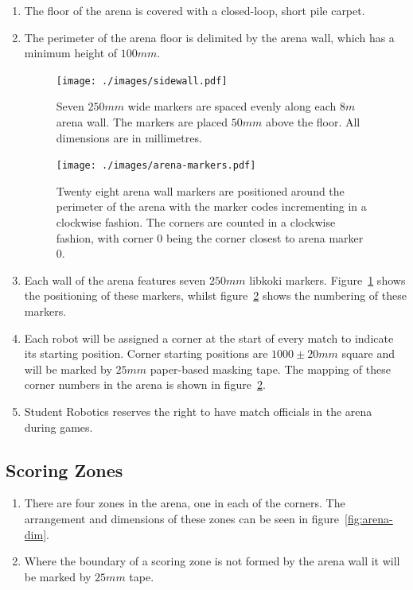 \begin{enumerate}
\item The floor of the arena is covered with a closed-loop, short pile carpet.

\item The perimeter of the arena floor is delimited by the arena wall, which has a minimum height of $100mm$.

\begin{figure}
  \centering
  \texttt{[image: ./images/sidewall.pdf]}
  \caption{Seven $250mm$ wide markers are spaced evenly along each $8m$ arena wall.
           The markers are placed $50mm$ above the floor.
           All dimensions are in millimetres.}
  \label{fig:arena-wall}
\end{figure}

\begin{figure}
  \centering
  \texttt{[image: ./images/arena-markers.pdf]}
  \caption{Twenty eight arena wall markers are positioned around the perimeter of the arena with the marker codes incrementing in a clockwise fashion.
           The corners are counted in a clockwise fashion, with corner 0 being the corner closest to arena marker 0.}
  \label{fig:arena-zones}
\end{figure}

\item Each wall of the arena features seven $250mm$ libkoki markers.
      Figure~\ref{fig:arena-wall} shows the positioning of these markers, whilst figure~\ref{fig:arena-zones} shows the numbering of these markers.

\item Each robot will be assigned a corner at the start of every match to indicate its starting position.
      Corner starting positions are $1000 \pm 20mm$ square and will be marked by $25mm$ paper-based masking tape.
      The mapping of these corner numbers in the arena is shown in figure~\ref{fig:arena-zones}.

\item Student Robotics reserves the right to have match officials in the arena during games.

\end{enumerate}


\subsection{Scoring Zones}
\label{sub:Zones}

\begin{enumerate}
\item There are four zones in the arena, one in each of the corners.
      The arrangement and dimensions of these zones can be seen in figure~\ref{fig:arena-dim}.

\item Where the boundary of a scoring zone is not formed by the arena wall it will be marked by $25mm$ tape.
\end{enumerate}

